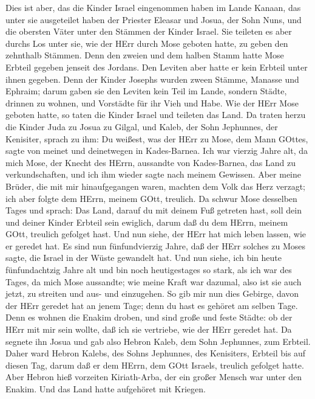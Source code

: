  Dies ist aber, das die Kinder Israel eingenommen haben im
Lande Kanaan, das unter sie ausgeteilet haben der Priester Eleasar und
Josua, der Sohn Nuns, und die obersten Väter unter den Stämmen der
Kinder Israel.  Sie teileten es aber durchs Los unter sie,
wie der HErr durch Mose geboten hatte, zu geben den zehnthalb Stämmen.
 Denn den zweien und dem halben Stamm hatte Mose Erbteil
gegeben jenseit des Jordans. Den Leviten aber hatte er kein Erbteil
unter ihnen gegeben.  Denn der Kinder Josephs wurden zween
Stämme, Manasse und Ephraim; darum gaben sie den Leviten kein Teil im
Lande, sondern Städte, drinnen zu wohnen, und Vorstädte für ihr Vieh und
Habe.  Wie der HErr Mose geboten hatte, so taten die Kinder
Israel und teileten das Land.  Da traten herzu die Kinder
Juda zu Josua zu Gilgal, und Kaleb, der Sohn Jephunnes, der Kenisiter,
sprach zu ihm: Du weißest, was der HErr zu Mose, dem Mann GOttes, sagte
von meinet und deinetwegen in Kades-Barnea.  Ich war vierzig
Jahre alt, da mich Mose, der Knecht des HErrn, aussandte von
Kades-Barnea, das Land zu verkundschaften, und ich ihm wieder sagte nach
meinem Gewissen.  Aber meine Brüder, die mit mir
hinaufgegangen waren, machten dem Volk das Herz verzagt; ich aber folgte
dem HErrn, meinem GOtt, treulich.  Da schwur Mose desselben
Tages und sprach: Das Land, darauf du mit deinem Fuß getreten hast, soll
dein und deiner Kinder Erbteil sein ewiglich, darum daß du dem HErrn,
meinem GOtt, treulich gefolget hast.  Und nun siehe, der
HErr hat mich leben lassen, wie er geredet hat. Es sind nun
fünfundvierzig Jahre, daß der HErr solches zu Moses sagte, die Israel in
der Wüste gewandelt hat. Und nun siehe, ich bin heute fünfundachtzig
Jahre alt  und bin noch heutigestages so stark, als ich war
des Tages, da mich Mose aussandte; wie meine Kraft war dazumal, also ist
sie auch jetzt, zu streiten und aus- und einzugehen.  So
gib mir nun dies Gebirge, davon der HErr geredet hat an jenem Tage; denn
du hast es gehöret am selben Tage. Denn es wohnen die Enakim droben, und
sind große und feste Städte: ob der HErr mit mir sein wollte, daß ich
sie vertriebe, wie der HErr geredet hat.  Da segnete ihn
Josua und gab also Hebron Kaleb, dem Sohn Jephunnes, zum Erbteil.
 Daher ward Hebron Kalebs, des Sohns Jephunnes, des
Kenisiters, Erbteil bis auf diesen Tag, darum daß er dem HErrn, dem GOtt
Israels, treulich gefolget hatte.  Aber Hebron hieß
vorzeiten Kiriath-Arba, der ein großer Mensch war unter den Enakim. Und
das Land hatte aufgehöret mit Kriegen.

